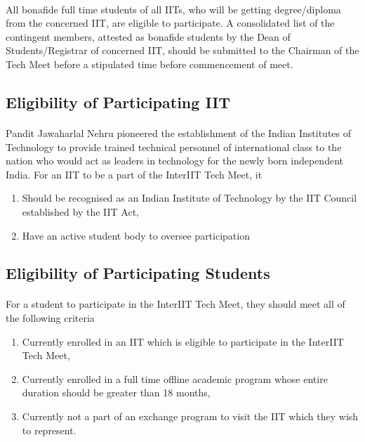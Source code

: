 \paragraph{}
All bonafide full time students of all IITs, who will be getting degree/diploma from the concerned IIT, are eligible to participate. A consolidated list of the contingent members, attested as bonafide students by the Dean of Students/Registrar of concerned IIT, should be submitted to the Chairman of the Tech Meet before a stipulated time before commencement of meet.

\subsection{Eligibility of Participating IIT}
\paragraph{}
Pandit Jawaharlal Nehru pioneered the establishment of the Indian Institutes of Technology to provide trained technical personnel of international class to the nation who would act as leaders in technology for the newly born independent India. For an IIT to be a part of the InterIIT Tech Meet, it 
\begin{enumerate}
    \item Should be recognised as an Indian Institute of Technology by the IIT Council established by the IIT Act,
    \item Have an active student body to oversee participation
\end{enumerate}

\subsection{Eligibility of Participating Students}

\paragraph{}
For a student to participate in the InterIIT Tech Meet, they should meet all of the following criteria
\begin{enumerate}
    \item Currently enrolled in an IIT which is eligible to participate in the InterIIT Tech Meet,
    \item Currently enrolled in a full time offline academic program whose entire duration should be greater than 18 months,
    \item Currently not a part of an exchange program to visit the IIT which they wish to represent.
\end{enumerate}


